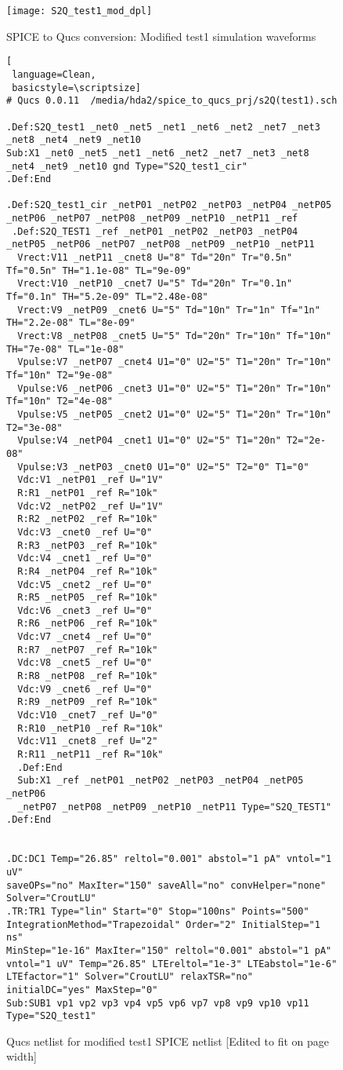 \begin{figure}
  \centering
  \texttt{[image: S2Q\_test1\_mod\_dpl]}
  \caption{SPICE to Qucs conversion: Modified test1 simulation waveforms} 
  \label{fig:S2Qtest1_5} 
\end{figure} 

\begin{figure}
  \centering
\begin{lstlisting}[
 language=Clean, 
 basicstyle=\scriptsize]
# Qucs 0.0.11  /media/hda2/spice_to_qucs_prj/s2Q(test1).sch

.Def:S2Q_test1 _net0 _net5 _net1 _net6 _net2 _net7 _net3 
_net8 _net4 _net9 _net10
Sub:X1 _net0 _net5 _net1 _net6 _net2 _net7 _net3 _net8 
_net4 _net9 _net10 gnd Type="S2Q_test1_cir"
.Def:End

.Def:S2Q_test1_cir _netP01 _netP02 _netP03 _netP04 _netP05 
_netP06 _netP07 _netP08 _netP09 _netP10 _netP11 _ref
 .Def:S2Q_TEST1 _ref _netP01 _netP02 _netP03 _netP04 
_netP05 _netP06 _netP07 _netP08 _netP09 _netP10 _netP11
  Vrect:V11 _netP11 _cnet8 U="8" Td="20n" Tr="0.5n" Tf="0.5n" TH="1.1e-08" TL="9e-09"
  Vrect:V10 _netP10 _cnet7 U="5" Td="20n" Tr="0.1n" Tf="0.1n" TH="5.2e-09" TL="2.48e-08"
  Vrect:V9 _netP09 _cnet6 U="5" Td="10n" Tr="1n" Tf="1n" TH="2.2e-08" TL="8e-09"
  Vrect:V8 _netP08 _cnet5 U="5" Td="20n" Tr="10n" Tf="10n" TH="7e-08" TL="1e-08"
  Vpulse:V7 _netP07 _cnet4 U1="0" U2="5" T1="20n" Tr="10n" Tf="10n" T2="9e-08"
  Vpulse:V6 _netP06 _cnet3 U1="0" U2="5" T1="20n" Tr="10n" Tf="10n" T2="4e-08"
  Vpulse:V5 _netP05 _cnet2 U1="0" U2="5" T1="20n" Tr="10n" T2="3e-08"
  Vpulse:V4 _netP04 _cnet1 U1="0" U2="5" T1="20n" T2="2e-08"
  Vpulse:V3 _netP03 _cnet0 U1="0" U2="5" T2="0" T1="0"
  Vdc:V1 _netP01 _ref U="1V"
  R:R1 _netP01 _ref R="10k"
  Vdc:V2 _netP02 _ref U="1V"
  R:R2 _netP02 _ref R="10k"
  Vdc:V3 _cnet0 _ref U="0"
  R:R3 _netP03 _ref R="10k"
  Vdc:V4 _cnet1 _ref U="0"
  R:R4 _netP04 _ref R="10k"
  Vdc:V5 _cnet2 _ref U="0"
  R:R5 _netP05 _ref R="10k"
  Vdc:V6 _cnet3 _ref U="0"
  R:R6 _netP06 _ref R="10k"
  Vdc:V7 _cnet4 _ref U="0"
  R:R7 _netP07 _ref R="10k"
  Vdc:V8 _cnet5 _ref U="0"
  R:R8 _netP08 _ref R="10k"
  Vdc:V9 _cnet6 _ref U="0"
  R:R9 _netP09 _ref R="10k"
  Vdc:V10 _cnet7 _ref U="0"
  R:R10 _netP10 _ref R="10k"
  Vdc:V11 _cnet8 _ref U="2"
  R:R11 _netP11 _ref R="10k"
  .Def:End
  Sub:X1 _ref _netP01 _netP02 _netP03 _netP04 _netP05 _netP06 
  _netP07 _netP08 _netP09 _netP10 _netP11 Type="S2Q_TEST1"
.Def:End


.DC:DC1 Temp="26.85" reltol="0.001" abstol="1 pA" vntol="1 uV" 
saveOPs="no" MaxIter="150" saveAll="no" convHelper="none" Solver="CroutLU"
.TR:TR1 Type="lin" Start="0" Stop="100ns" Points="500" 
IntegrationMethod="Trapezoidal" Order="2" InitialStep="1 ns" 
MinStep="1e-16" MaxIter="150" reltol="0.001" abstol="1 pA" 
vntol="1 uV" Temp="26.85" LTEreltol="1e-3" LTEabstol="1e-6" 
LTEfactor="1" Solver="CroutLU" relaxTSR="no" initialDC="yes" MaxStep="0"
Sub:SUB1 vp1 vp2 vp3 vp4 vp5 vp6 vp7 vp8 vp9 vp10 vp11 Type="S2Q_test1"

\end{lstlisting}
 \caption{Qucs netlist for modified test1 SPICE netlist [Edited to fit on page width]}
  \label{fig:S2Qtest1_6}
\end{figure} 


